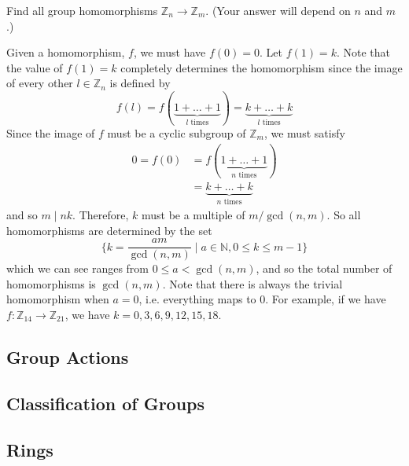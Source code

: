   \begin{exercise}[Assigned]
    Find all group homomorphisms $\mathbb{Z}_n \to \mathbb{Z}_m$. (Your answer will depend on $n$ and $m$.) 
  \end{exercise}
  \begin{solution}
    Given a homomorphism, $f$, we must have $f(0) = 0$. Let $f(1) = k$. Note that the value of $f(1) = k$ completely determines the homomorphism since the image of every other $l \in \mathbb{Z}_n$ is defined by 
    \begin{equation}
      f(l) = f(\underbrace{1 + \ldots + 1}_{l \text{ times}}) = \underbrace{k + \ldots + k}_{l \text{ times}}
    \end{equation}
    Since the image of $f$ must be a cyclic subgroup of $\mathbb{Z}_m$, we must satisfy 
    \begin{align}
      0 = f(0) & = f(\underbrace{1 + \ldots + 1}_{n \text{ times}}) \\
               & = \underbrace{k + \ldots + k}_{n \text{ times}} 
    \end{align}
    and so $m \mid nk$. Therefore, $k$ must be a multiple of $m/\gcd(n, m)$. So all homomorphisms are determined by the set 
    \begin{equation}
      \bigg\{ k = \frac{a m}{\gcd(n, m)} \; \bigg| \; a \in \mathbb{N}, 0 \leq k \leq m-1 \bigg\}
    \end{equation}
    which we can see ranges from $0 \leq a < \gcd(n, m)$, and so the total number of homomorphisms is $\gcd(n, m)$. Note that there is always the trivial homomorphism when $a = 0$, i.e. everything maps to $0$. For example, if we have $f: \mathbb{Z}_{14} \to \mathbb{Z}_{21}$, we have $k = 0, 3, 6, 9, 12, 15, 18$. 
  \end{solution}

\subsection{Group Actions}

\subsection{Classification of Groups}

\subsection{Rings}

